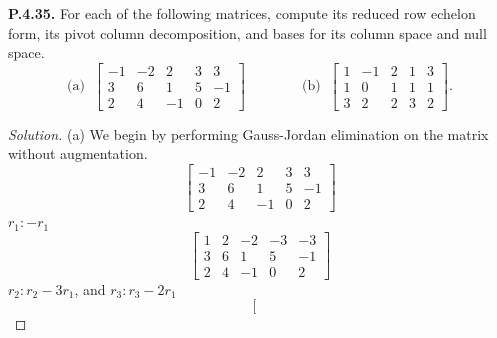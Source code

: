 \documentclass[12pt]{amsart}
\newenvironment{solution}
{\begin{proof}[Solution]}
{\end{proof}}
\begin{document}
\begin{onehalfspace}
        \noindent\textbf{P.4.35.} For each of the following matrices, compute its reduced row echelon form, its pivot
        column decomposition, and bases for its column space and null space.
        \begin{displaymath}
            \text{(a)}\;\;\left[\begin{matrix}
                                    -1 & -2 & 2 & 3 & 3\\
                                    3 & 6 & 1 & 5 & -1\\
                                    2 & 4 & -1 & 0 & 2
            \end{matrix}\right]
            \qquad\qquad
            \text{(b)}\;\;\left[\begin{matrix}
                                    1 & -1 & 2 & 1 & 3\\
                                    1 & 0 & 1 & 1 & 1\\
                                    3 & 2 & 2 & 3 & 2
            \end{matrix}\right].
        \end{displaymath}
        \begin{solution}
            (a) We begin by performing Gauss-Jordan elimination on the matrix without augmentation.
            \begin{displaymath}
                \left[\begin{matrix}
                          -1 & -2 & 2 & 3 & 3\\
                          3 & 6 & 1 & 5 & -1\\
                          2 & 4 & -1 & 0 & 2
                \end{matrix}\right]
            \end{displaymath}
            $r_1:-r_1$
            \begin{displaymath}
                \left[\begin{matrix}
                          1 & 2 & -2 & -3 & -3\\
                          3 & 6 & 1 & 5 & -1\\
                          2 & 4 & -1 & 0 & 2
                \end{matrix}\right]
            \end{displaymath}
            $r_2:r_2-3r_1$, and $r_3:r_3-2r_1$
            \begin{displaymath}
                \left[\begin{matrix}

\end{matrix}
\end{displaymath}
\end{solution}
\end{onehalfspace}
\end{document}
